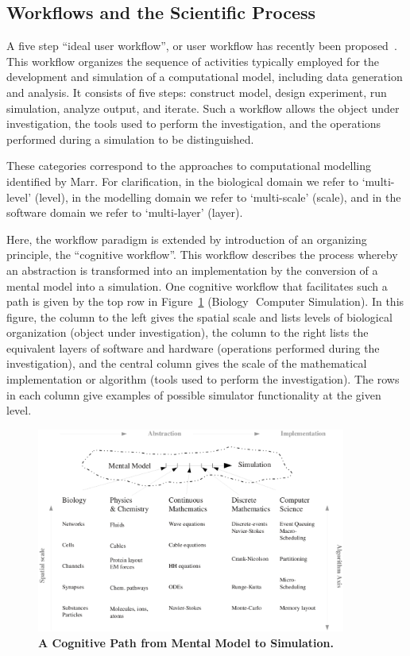 \documentclass{article}
\begin{document}
\subsection{Workflows and the Scientific Process}
A five step “ideal user workflow”, or user workflow has recently been proposed~\cite{10.1371/journal.pone.0028956}.  This workflow organizes the sequence of activities typically employed for the development and simulation of a computational model, including data generation and analysis.  It consists of five steps: construct model, design experiment, run simulation, analyze output, and iterate.  Such a workflow allows the object under investigation, the tools used to perform the investigation, and the operations performed during a simulation to be distinguished.

These categories correspond to the approaches to computational modelling identified by Marr.  For clarification, in the biological domain we refer to ‘multi-level’ (level), in the modelling domain we refer to ‘multi-scale’ (scale), and in the software domain we refer to ‘multi-layer’ (layer).

Here, the workflow paradigm is extended by introduction of an organizing principle, the “cognitive workflow”. This workflow describes the process whereby an abstraction is transformed into an implementation by the conversion of a mental model into a simulation.  One cognitive workflow that facilitates such a path is given by the top row in Figure~\ref{fig:mental-model-simulation-path} (Biology \textrightarrow\,\,Computer Simulation).  In this figure, the column to the left gives the spatial scale and lists levels of biological organization (object under investigation), the column to the right lists the equivalent layers of software and hardware (operations performed during the investigation), and the central column gives the scale of the mathematical implementation or algorithm (tools used to perform the investigation).  The rows in each column give examples of possible simulator functionality at the given level.

\begin{figure}[h!t]
  \begin{center}
    \includegraphics[width=4in]{figures/NS-abstraction-implementation.eps}
  \end{center}
  \caption{ {\bf A Cognitive Path from Mental Model to Simulation.} }
  \label{fig:mental-model-simulation-path}
\end{figure}
\end{document}
